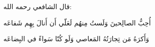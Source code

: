 \vspace*{\fill}
قال الشافعي رحمه الله:
\begin{center}
    أُحِبُّ الصالِحينَ وَلَستُ مِنهُم  \qquad  لَعَلّي أَن أَنالَ بِهِم شَفاعَه

    وَأَكرَهُ مَن تِجارَتُهُ المَعاصي  \qquad   وَلَو كُنّا سَواءً في البِضاعَه
\end{center}
\vspace*{\fill}